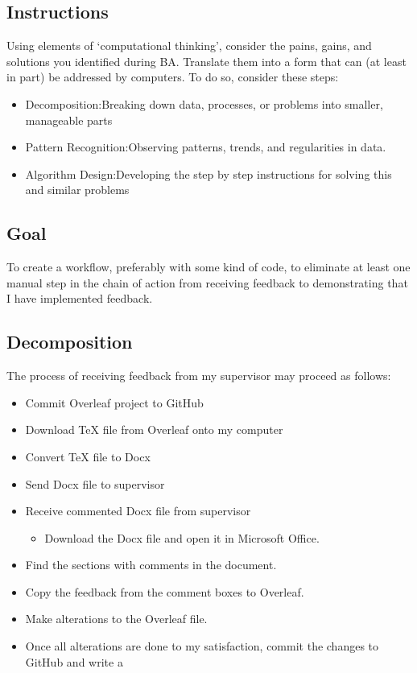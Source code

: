 \documentclass{article}
\begin{document}
\subsection{Instructions}
Using elements of ‘computational thinking’, consider the pains, gains, and solutions you identified during BA. Translate them into a form that can (at least in part) be addressed by computers. To do so, consider these steps:
\begin{itemize}
    \item Decomposition:Breaking down data, processes, or problems into smaller, manageable parts
    \item Pattern Recognition:Observing patterns, trends, and regularities in data.
    \item Algorithm Design:Developing the step by step instructions for solving this and similar problems
\end{itemize}

\subsection{Goal}

To create a workflow, preferably with some kind of code, to eliminate at least one manual step in the chain of action from receiving feedback to demonstrating that I have implemented feedback.

\subsection{Decomposition}

The process of receiving feedback from my supervisor may proceed as follows:

\begin{itemize}
    \item Commit Overleaf project to GitHub
    \item Download TeX file from Overleaf onto my computer
    \item Convert TeX file to Docx
    \item Send Docx file to supervisor
    \item Receive commented Docx file from supervisor
    \begin{itemize}
    \item Download the Docx file and open it in Microsoft Office.
    \end{itemize}
    \item Find the sections with comments in the document.
    \item Copy the feedback from the comment boxes to Overleaf.
    \item Make alterations to the Overleaf file.
    \item Once all alterations are done to my satisfaction, commit the changes to GitHub and write a 
    
\end{itemize}
\end{document}
